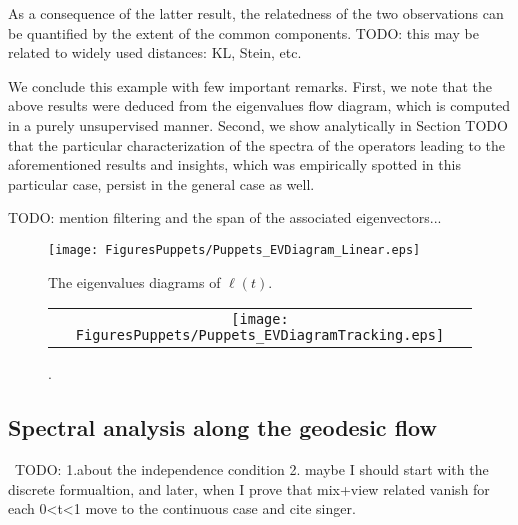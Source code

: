 \documentclass[]{article}
\theoremstyle{definition}
\begin{document}
As a consequence of the latter result, the relatedness of the two observations can be quantified by the extent of the common components. TODO: this may be related to widely used distances: KL, Stein, etc.

We conclude this example with few important remarks.
First, we note that the above results were deduced from the eigenvalues flow diagram, which is computed in a purely unsupervised manner. Second, we show analytically in Section TODO that the particular characterization of the spectra of the operators leading to the aforementioned results and insights, which was empirically spotted in this particular case, persist in the general case as well.  

TODO: mention filtering and the span of the associated eigenvectors...

	
	\begin{figure}[H]\centering
		\texttt{[image: FiguresPuppets/Puppets\_EVDiagram\_Linear.eps]}
		\caption {The eigenvalues diagrams of $\ell(t)$.}
		\label{fig:Puppets_EVDiagrams_Linear}
	\end{figure}

	\begin{figure}[H]\centering
		\begin{tabular}{c}
			\hspace{-0.1in} \texttt{[image: FiguresPuppets/Puppets\_EVDiagramTracking.eps]}
		\end{tabular}
		\caption {.}
		\label{fig:Puppets_EVDiagramTracking}
	\end{figure}
	
	
	
	
	\subsection{Spectral analysis along the geodesic flow}\
	TODO: 
	1.about the independence condition
	2. maybe I should start with the discrete formualtion, and later, when I prove that mix+view related vanish for each 0<t<1 move to the continuous case and cite singer.
	
\end{document}
